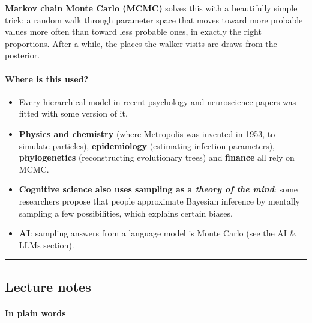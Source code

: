 \textbf{Markov chain Monte Carlo (MCMC)} solves this with a beautifully
simple trick: a random walk through parameter space that moves toward
more probable values more often than toward less probable ones, in
exactly the right proportions. After a while, the places the walker
visits are draws from the posterior.

\paragraph{Where is this used?}

\begin{itemize}
\tightlist
\item
  Every hierarchical model in recent psychology and neuroscience papers
  was fitted with some version of it.
\item
  \textbf{Physics and chemistry} (where Metropolis was invented in 1953,
  to simulate particles), \textbf{epidemiology} (estimating infection
  parameters), \textbf{phylogenetics} (reconstructing evolutionary
  trees) and \textbf{finance} all rely on MCMC.
\item
  \textbf{Cognitive science also uses sampling as a \emph{theory of the
  mind}}: some researchers propose that people approximate Bayesian
  inference by mentally sampling a few possibilities, which explains
  certain biases.
\item
  \textbf{AI}: sampling answers from a language model is Monte Carlo
  (see the AI \& LLMs section).
\end{itemize}

\begin{center}\rule{0.5\linewidth}{0.5pt}\end{center}


\subsection{Lecture notes}

\paragraph{In plain words}

